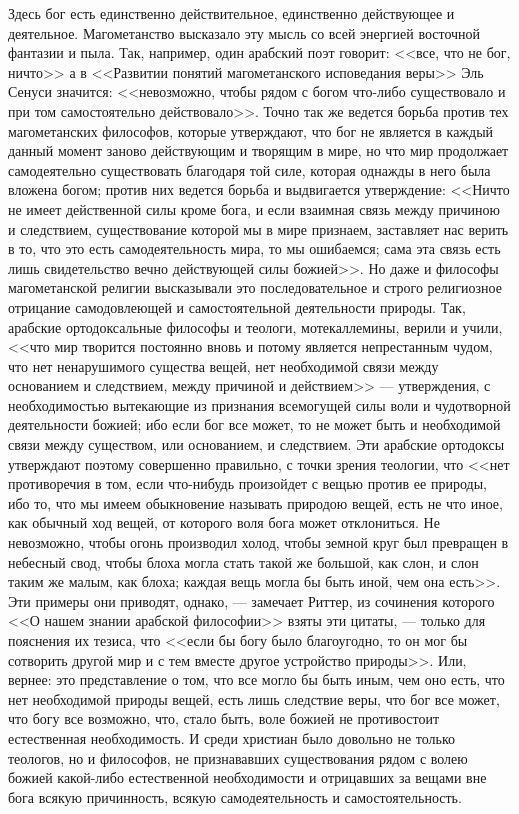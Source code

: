\documentclass[12pt]{article}
\begin{document}
Здесь бог есть единственно действительное, единственно действующее и деятельное. Магометанство высказало эту мысль со всей энергией восточной фантазии и пыла. Так, например, один арабский поэт говорит: <<все, что не бог, ничто>>  а в <<Развитии понятий магометанского исповедания веры>> Эль Сенуси значится: <<невозможно, чтобы рядом с богом что-либо существовало и при том самостоятельно действовало>>. Точно так же ведется борьба против тех магометанских философов, которые утверждают, что бог не является в каждый данный момент заново действующим и творящим в мире, но что мир продолжает самодеятельно существовать благодаря той силе, которая однажды в него была вложена богом; против них ведется борьба и выдвигается утверждение: <<Ничто не имеет действенной силы кроме бога, и если взаимная связь между причиною и следствием, существование которой мы в мире признаем, заставляет нас верить в то, что это есть самодеятельность мира, то мы ошибаемся; сама эта связь есть лишь свидетельство вечно действующей силы божией>>. Но даже и философы магометанской религии высказывали это последовательное и строго религиозное отрицание самодовлеющей и самостоятельной деятельности природы. Так, арабские ортодоксальные философы и теологи, мотекаллемины, верили и учили, <<что мир творится постоянно вновь и потому является непрестанным чудом, что нет ненарушимого существа вещей, нет необходимой связи между основанием и следствием, между причиной и действием>>  --- утверждения, с необходимостью вытекающие из признания всемогущей силы воли и чудотворной деятельности божией; ибо если бог все может, то не может быть и необходимой связи между существом, или основанием, и следствием. Эти арабские ортодоксы утверждают поэтому совершенно правильно, с точки зрения теологии, что <<нет противоречия в том, если что-нибудь произойдет с вещью против ее природы, ибо то, что мы имеем обыкновение называть природою вещей, есть не что иное, как обычный ход вещей, от которого воля бога может отклониться. Не невозможно, чтобы огонь производил холод, чтобы земной круг был превращен в небесный свод, чтобы блоха могла стать такой же большой, как слон, и слон таким же малым, как блоха; каждая вещь могла бы быть иной, чем она есть>>. Эти примеры они приводят, однако, --- замечает Риттер, из сочинения которого <<О нашем знании арабской философии>> взяты эти цитаты, --- только для пояснения их тезиса, что <<если бы богу было благоугодно, то он мог бы сотворить другой мир и с тем вместе другое устройство природы>>. Или, вернее: это представление о том, что все могло бы быть иным, чем оно есть, что нет необходимой природы вещей, есть лишь следствие веры, что бог все может, что богу все возможно, что, стало быть, воле божией не противостоит естественная необходимость. И среди христиан было довольно не только теологов, но и философов, не признававших существования рядом с волею божией какой-либо естественной необходимости и отрицавших за вещами вне бога всякую причинность, всякую самодеятельность и самостоятельность. 
\end{document}
